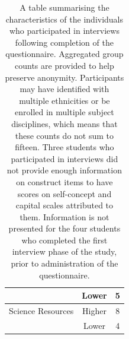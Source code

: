 \documentclass[a4paper,man,natbib]{apa6}
\begin{document}
\begin{table}[]
\begin{tabular}{cc|c}
                       & Lower                    & 5     \\ \hline
Science Resources      & Higher                   & 8     \\
                       & Lower                    & 4    
\end{tabular}
\caption{\label{tab:Demographics} A table summarising the characteristics of the individuals who participated in interviews following completion of the questionnaire. Aggregated group counts are provided to help preserve anonymity. Participants may have identified with multiple ethnicities or be enrolled in multiple subject disciplines, which means that these counts do not sum to fifteen. Three students who participated in interviews did not provide enough information on construct items to have scores on self-concept and capital scales attributed to them. Information is not presented for the four students who completed the first interview phase of the study, prior to administration of the questionnaire.}
\end{table}




\end{document}
